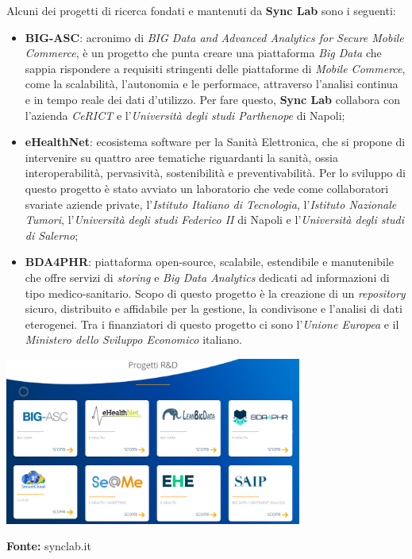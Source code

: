 Alcuni dei progetti di ricerca fondati e mantenuti da \textbf{Sync Lab} sono i seguenti:
\begin{itemize}
  \item \textbf{BIG-ASC}: acronimo di \textit{BIG Data and Advanced Analytics for Secure Mobile Commerce}, è un progetto che punta creare una piattaforma \textit{Big Data} che sappia rispondere a requisiti stringenti delle piattaforme di \textit{Mobile Commerce}, come la scalabilità, l'autonomia e le performace, attraverso l'analisi continua e in tempo reale dei dati d'utilizzo. Per fare questo, \textbf{Sync Lab} collabora con l'azienda \textit{CeRICT} e l'\textit{Università degli studi Parthenope} di Napoli;
  \item \textbf{eHealthNet}: ecosistema software per la Sanità Elettronica, che si propone di intervenire su quattro aree tematiche riguardanti la sanità, ossia interoperabilità, pervasività, sostenibilità e preventivabilità. Per lo sviluppo di questo progetto è stato avviato un laboratorio che vede come collaboratori svariate aziende private, l'\textit{Istituto Italiano di Tecnologia}, l'\textit{Istituto Nazionale Tumori}, l'\textit{Università degli studi Federico II} di Napoli e l'\textit{Università degli studi di Salerno};
  \item \textbf{BDA4PHR}: piattaforma open-source, scalabile, estendibile e manutenibile che offre servizi di \textit{storing} e \textit{Big Data Analytics} dedicati ad informazioni di tipo medico-sanitario. Scopo di questo progetto è la creazione di un \textit{repository} sicuro, distribuito e affidabile per la gestione, la condivisone e l'analisi di dati eterogenei. Tra i finanziatori di questo progetto ci sono l'\textit{Unione Europea} e il \textit{Ministero dello Sviluppo Economico} italiano.
\end{itemize}

\begin{minipage}{\linewidth}
  \centering
    \includegraphics[height=5.5cm]{immagini/progetti}
  \caption*{\textbf{Fonte:} synclab.it}
\end{minipage}

